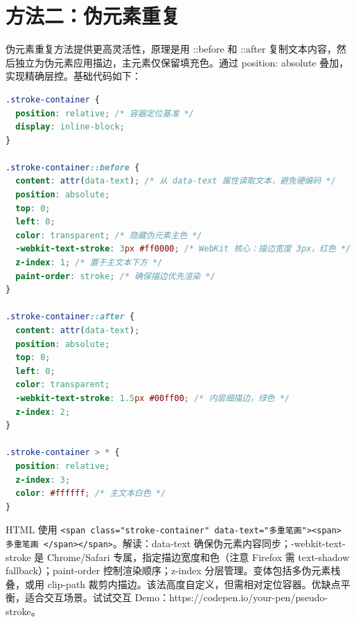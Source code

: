 \section{方法二：伪元素重复}
伪元素重复方法提供更高灵活性，原理是用 ::before 和 ::after 复制文本内容，然后独立为伪元素应用描边，主元素仅保留填充色。通过 position: absolute 叠加，实现精确层控。基础代码如下：\par
\begin{lstlisting}[language=css]
.stroke-container {
  position: relative; /* 容器定位基准 */
  display: inline-block;
}

.stroke-container::before {
  content: attr(data-text); /* 从 data-text 属性读取文本，避免硬编码 */
  position: absolute;
  top: 0;
  left: 0;
  color: transparent; /* 隐藏伪元素主色 */
  -webkit-text-stroke: 3px #ff0000; /* WebKit 核心：描边宽度 3px，红色 */
  z-index: 1; /* 置于主文本下方 */
  paint-order: stroke; /* 确保描边优先渲染 */
}

.stroke-container::after {
  content: attr(data-text);
  position: absolute;
  top: 0;
  left: 0;
  color: transparent;
  -webkit-text-stroke: 1.5px #00ff00; /* 内层细描边，绿色 */
  z-index: 2;
}

.stroke-container > * {
  position: relative;
  z-index: 3;
  color: #ffffff; /* 主文本白色 */
}
\end{lstlisting}
HTML 使用 \texttt{<span class="stroke-container" data-text="多重笔画"><span> 多重笔画 </span></span>}。解读：data-text 确保伪元素内容同步；-webkit-text-stroke 是 Chrome/Safari 专属，指定描边宽度和色（注意 Firefox 需 text-shadow fallback）；paint-order 控制渲染顺序；z-index 分层管理。变体包括多伪元素栈叠，或用 clip-path 裁剪内描边。该法高度自定义，但需相对定位容器。优缺点平衡，适合交互场景。试试交互 Demo：https://codepen.io/your-pen/pseudo-stroke。\par

